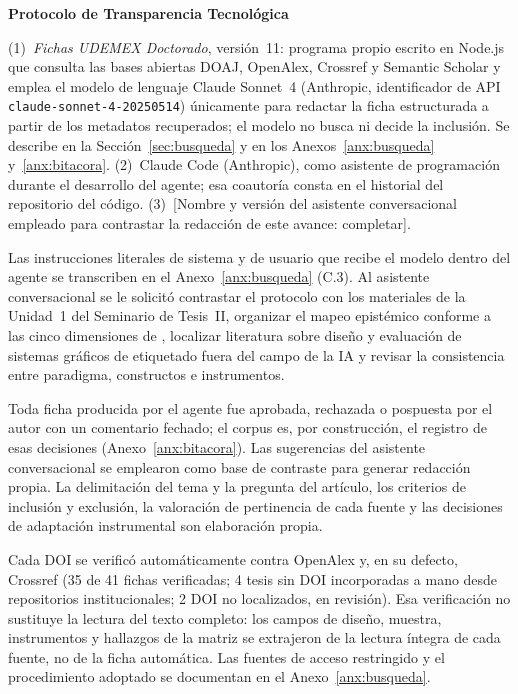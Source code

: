 \documentclass[letter,12pt]{article}
\begin{document}
\textbf{Protocolo de Transparencia Tecnológica}
    \begin{description}[style=nextline, leftmargin=0.5cm, labelsep=0.2cm]

        \item[\textbf{Herramientas utilizadas (identificadas por nombre):}]
        (1)~\textit{Fichas UDEMEX Doctorado}, versión~11: programa propio escrito en Node.js que consulta las bases abiertas DOAJ, OpenAlex, Crossref y Semantic Scholar y emplea el modelo de lenguaje Claude Sonnet~4 (Anthropic, identificador de API \texttt{claude-sonnet-4-20250514}) únicamente para redactar la ficha estructurada a partir de los metadatos recuperados; el modelo no busca ni decide la inclusión. Se describe en la Sección~\ref{sec:busqueda} y en los Anexos~\ref{anx:busqueda} y~\ref{anx:bitacora}. (2)~Claude Code (Anthropic), como asistente de programación durante el desarrollo del agente; esa coautoría consta en el historial del repositorio del código. (3)~[Nombre y versión del asistente conversacional empleado para contrastar la redacción de este avance: completar].

        \item[\textbf{Prompts y alcance:}]
        Las instrucciones literales de sistema y de usuario que recibe el modelo dentro del agente se transcriben en el Anexo~\ref{anx:busqueda} (C.3). Al asistente conversacional se le solicitó contrastar el protocolo con los materiales de la Unidad~1 del Seminario de Tesis~II, organizar el mapeo epistémico conforme a las cinco dimensiones de \citet{deroncele2021}, localizar literatura sobre diseño y evaluación de sistemas gráficos de etiquetado fuera del campo de la IA y revisar la consistencia entre paradigma, constructos e instrumentos.

        \item[\textbf{Manejo de resultados y autoría:}]
        Toda ficha producida por el agente fue aprobada, rechazada o pospuesta por el autor con un comentario fechado; el corpus es, por construcción, el registro de esas decisiones (Anexo~\ref{anx:bitacora}). Las sugerencias del asistente conversacional se emplearon como base de contraste para generar redacción propia. La delimitación del tema y la pregunta del artículo, los criterios de inclusión y exclusión, la valoración de pertinencia de cada fuente y las decisiones de adaptación instrumental son elaboración propia.

        \item[\textbf{Verificación de integridad:}]
        Cada DOI se verificó automáticamente contra OpenAlex y, en su defecto, Crossref (35 de 41 fichas verificadas; 4 tesis sin DOI incorporadas a mano desde repositorios institucionales; 2 DOI no localizados, en revisión). Esa verificación no sustituye la lectura del texto completo: los campos de diseño, muestra, instrumentos y hallazgos de la matriz se extrajeron de la lectura íntegra de cada fuente, no de la ficha automática. Las fuentes de acceso restringido y el procedimiento adoptado se documentan en el Anexo~\ref{anx:busqueda}.


\end{description}
\end{document}
